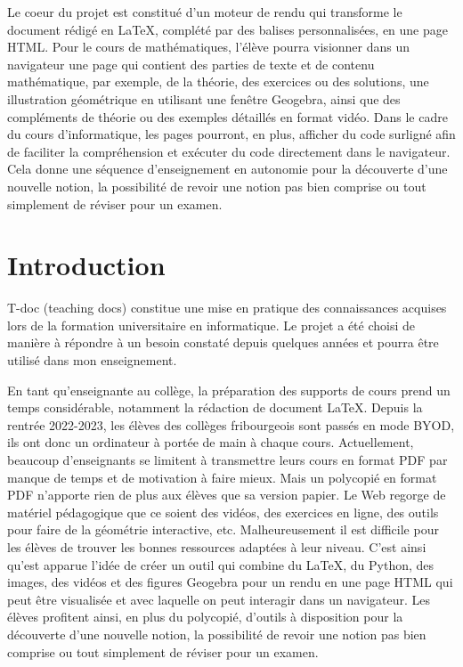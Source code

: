 \documentclass[12pt,titlepage,oneside]{article}
\renewcommand{\footnote}[1]{}
\begin{document}
Le coeur du projet est constitué d'un moteur de rendu qui transforme le document rédigé en LaTeX, complété par des balises personnalisées, en une page HTML.  Pour le cours de mathématiques, l'élève pourra visionner dans un navigateur une page qui contient des parties de texte et de contenu mathématique, par exemple, de la théorie, des exercices ou des solutions, une illustration géométrique en utilisant une fenêtre Geogebra, ainsi que des compléments de théorie ou des exemples détaillés en format vidéo. Dans le cadre du cours d'informatique, les pages pourront, en plus, afficher du code surligné afin de faciliter la compréhension et exécuter du code directement dans le navigateur. Cela donne une séquence d'enseignement en autonomie pour la découverte d'une nouvelle notion, la possibilité de revoir une notion pas bien comprise ou tout simplement de réviser pour un examen.

\newpage

\tableofcontents
\thispagestyle{empty}

\clearpage

\setcounter{page}{1}
\section*{Introduction}
T-doc (teaching docs) constitue une mise en pratique des connaissances acquises lors de la formation universitaire en informatique. Le projet a été choisi de manière à répondre à un besoin constaté depuis quelques années et pourra être utilisé dans mon enseignement.\par

En tant qu'enseignante au collège, la préparation des supports de cours prend un temps considérable, notamment la rédaction de document LaTeX. Depuis la rentrée 2022-2023, les élèves des collèges fribourgeois sont passés en mode BYOD\footnote{Bring Your Own Device}, ils ont donc un ordinateur à portée de main à chaque cours. Actuellement, beaucoup d'enseignants se limitent à transmettre leurs cours en format PDF par manque de temps et de motivation à faire mieux. Mais un polycopié en format PDF n'apporte rien de plus aux élèves que sa version papier. Le Web regorge de matériel pédagogique que ce soient des vidéos, des exercices en ligne, des outils pour faire de la géométrie interactive, etc. Malheureusement il est difficile pour les élèves de trouver les bonnes ressources adaptées à leur niveau. C'est ainsi qu'est apparue l'idée de créer un outil qui combine du LaTeX, du Python, des images, des vidéos et des figures Geogebra pour un rendu en une page HTML qui peut être visualisée et avec laquelle on peut interagir dans un navigateur. Les élèves profitent ainsi, en plus du polycopié, d'outils à disposition pour la découverte d'une nouvelle notion, la possibilité de revoir une notion pas bien comprise ou tout simplement de réviser pour un examen.\par
\end{document}
